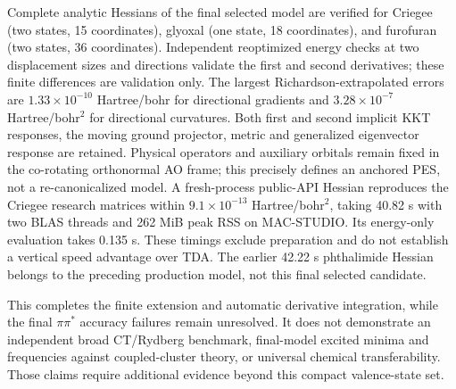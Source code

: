Complete analytic Hessians of the final selected model are verified for
Criegee (two states, 15 coordinates), glyoxal (one state, 18 coordinates),
and furofuran (two states, 36 coordinates). Independent reoptimized energy
checks at two displacement sizes and directions validate the first and
second derivatives; these finite differences are validation only. The largest Richardson-extrapolated
errors are $1.33\times10^{-10}$ Hartree/bohr for directional gradients and
$3.28\times10^{-7}$ Hartree/bohr$^2$ for directional curvatures. Both
first and second implicit KKT responses, the moving ground projector,
metric and generalized eigenvector response are retained. Physical operators
and auxiliary orbitals remain fixed in the co-rotating orthonormal AO frame;
this precisely defines an anchored PES, not a re-canonicalized model.
A fresh-process public-API Hessian reproduces the Criegee research matrices
within $9.1\times10^{-13}$ Hartree/bohr$^2$, taking 40.82 s with two BLAS
threads and 262 MiB peak RSS on MAC-STUDIO. Its energy-only evaluation takes
0.135 s. These timings exclude preparation and do not establish a vertical
speed advantage over TDA. The earlier 42.22 s phthalimide Hessian belongs
to the preceding production model, not this final selected candidate.

This completes the finite extension and automatic derivative integration,
while the final $\pi\pi^*$ accuracy failures remain unresolved.
It does not demonstrate an independent broad CT/Rydberg benchmark, final-model
excited minima and frequencies against coupled-cluster theory, or universal
chemical transferability. Those claims require additional evidence beyond
this compact valence-state set.

